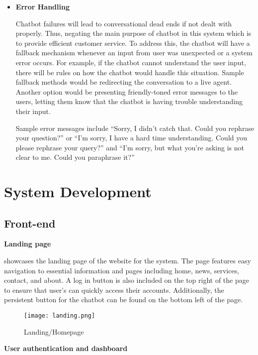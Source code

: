 \begin{itemize}
	\item \textbf{Error Handling}
	
	Chatbot failures will lead to conversational dead ends if not dealt with properly. Thus, negating the main purpose of chatbot in this system which is to provide efficient customer service. To address this, the chatbot will have a fallback mechanism whenever an input from user was unexpected or a system error occurs. For example, if the chatbot cannot understand the user input, there will be rules on how the chatbot would handle this situation. Sample fallback methods would be redirecting the conversation to a live agent. Another option would be presenting friendly-toned error messages to the users, letting them know that the chatbot is having trouble understanding their input.
	 
	\subitem Sample error messages include “Sorry, I didn't catch that. Could you rephrase your question?” or “I'm sorry, I have a hard time understanding. Could you please rephrase your query?” and “I'm sorry, but what you're asking is not clear to me. Could you paraphrase it?”
	
\end{itemize}


\section{System Development}

\subsection{Front-end}

\noindent\textbf{Landing page}

\noindent {} showcases the landing page of the website for the system. The page features easy navigation to essential information and pages including home, news, services, contact, and about. A log in button is also included on the top right of the page to ensure that user's can quickly access their accounts. Additionally, the persistent button for the chatbot can be found on the bottom left of the page.

\begin{figure}[h]
	\centering 
	\texttt{[image: landing.png]}
	\caption{Landing/Homepage}
	\label{fig:landing}
\end{figure}

\newpage

\noindent \textbf{User authentication and dashboard}

